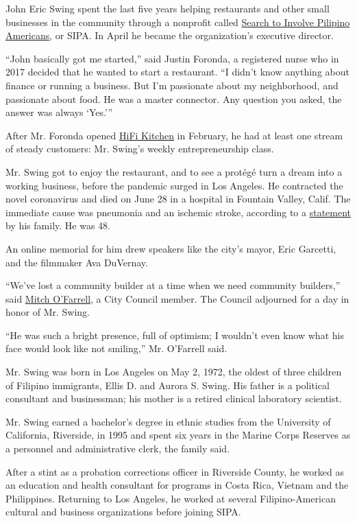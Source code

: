 John Eric Swing spent the last five years helping restaurants and other
small businesses in the community through a nonprofit called
\href{https://sipacares.org/}{Search to Involve Pilipino Americans}, or
SIPA. In April he became the organization's executive director.

``John basically got me started,'' said Justin Foronda, a registered
nurse who in 2017 decided that he wanted to start a restaurant. ``I
didn't know anything about finance or running a business. But I'm
passionate about my neighborhood, and passionate about food. He was a
master connector. Any question you asked, the answer was always `Yes.'''

After Mr. Foronda opened \href{https://www.hifi-kitchen.com/}{HiFi
Kitchen} in February, he had at least one stream of steady customers:
Mr. Swing's weekly entrepreneurship class.

Mr. Swing got to enjoy the restaurant, and to see a protégé turn a dream
into a working business, before the pandemic surged in Los Angeles. He
contracted the novel coronavirus and died on June 28 in a hospital in
Fountain Valley, Calif. The immediate cause was pneumonia and an
ischemic stroke, according to a
\href{https://www.gofundme.com/f/john-eric039s-fight-with-covid}{statement}
by his family. He was 48.

An online memorial for him drew speakers like the city's mayor, Eric
Garcetti, and the filmmaker Ava DuVernay.

``We've lost a community builder at a time when we need community
builders,'' said \href{https://cd13.lacity.org/}{Mitch O'Farrell}, a
City Council member. The Council adjourned for a day in honor of Mr.
Swing.

``He was such a bright presence, full of optimism; I wouldn't even know
what his face would look like not smiling,'' Mr. O'Farrell said.

Mr. Swing was born in Los Angeles on May 2, 1972, the oldest of three
children of Filipino immigrants, Ellis D. and Aurora S. Swing. His
father is a political consultant and businessman; his mother is a
retired clinical laboratory scientist.

Mr. Swing earned a bachelor's degree in ethnic studies from the
University of California, Riverside, in 1995 and spent six years in the
Marine Corps Reserves as a personnel and administrative clerk, the
family said.

After a stint as a probation corrections officer in Riverside County, he
worked as an education and health consultant for programs in Costa Rica,
Vietnam and the Philippines. Returning to Los Angeles, he worked at
several Filipino-American cultural and business organizations before
joining SIPA.

